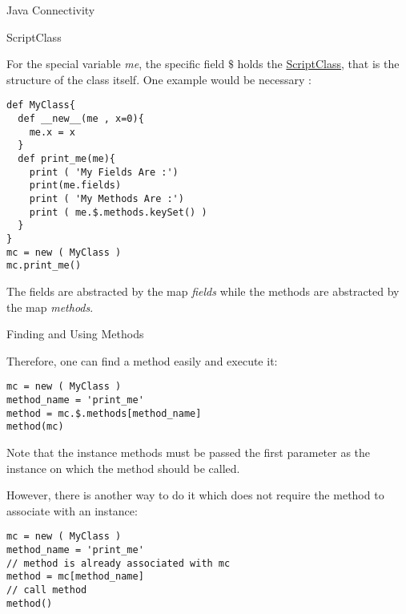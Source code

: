 \begin{section}{Java Connectivity}

\begin{subsection}{ScriptClass}

For the special variable \emph{me},
the specific field $\$$ holds the 
\href{https://github.com/nmondal/njexl/blob/master/lang/src/main/java/com/noga/njexl/lang/extension/oop/ScriptClass.java}{ScriptClass}, 
that is the structure of the class itself.
One example would be necessary :

\begin{center}\begin{minipage}{\linewidth}
\begin{lstlisting}[style=JexlStyle]
def MyClass{
  def __new__(me , x=0){
    me.x = x 
  }
  def print_me(me){
    print ( 'My Fields Are :')
    print(me.fields)
    print ( 'My Methods Are :')
    print ( me.$.methods.keySet() )
  }
}
mc = new ( MyClass )
mc.print_me()
\end{lstlisting}  
\end{minipage}\end{center}

The fields are abstracted by the map \emph{fields}
while the methods are abstracted by the map \emph{methods}.
\end{subsection}

\begin{subsection}{Finding and Using Methods}

Therefore, one can find a method easily and execute it:

\begin{center}\begin{minipage}{\linewidth}
\begin{lstlisting}[style=JexlStyle]
mc = new ( MyClass )
method_name = 'print_me'
method = mc.$.methods[method_name]
method(mc)
\end{lstlisting}  
\end{minipage}\end{center}

Note that the instance methods must be passed the first parameter
as the instance on which the method should be called.

However, there is another way to do it which does not require
the method to associate with an instance:

\begin{center}\begin{minipage}{\linewidth}
\begin{lstlisting}[style=JexlStyle]
mc = new ( MyClass )
method_name = 'print_me'
// method is already associated with mc
method = mc[method_name]
// call method
method()
\end{lstlisting}  
\end{minipage}\end{center}


\end{subsection}
\end{section}
